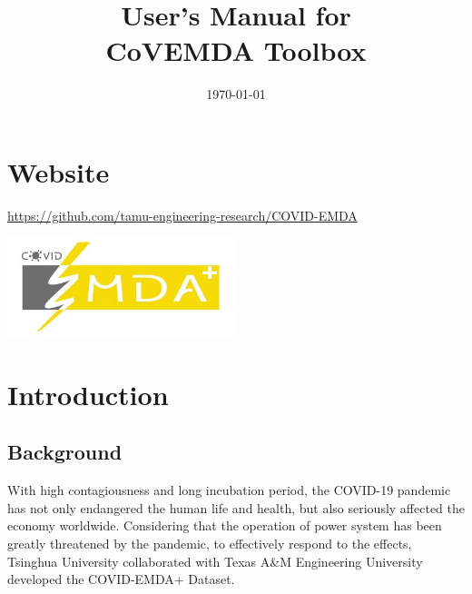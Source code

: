 \documentclass[11pt]{article}
\title{User's Manual for\\\textbf{CoVEMDA Toolbox}}
\author{}
\date{\today}
\numberwithin{equation}{section}
\numberwithin{table}{section}
\numberwithin{figure}{section}
\begin{document}
\makeatletter
\makeatother
\thispagestyle{empty}
\newpage
\tableofcontents
\thispagestyle{empty}


\newpage
\setcounter{page}{1}
\section*{Website}

\url{https://github.com/tamu-engineering-research/COVID-EMDA}

\begin{center}
	\noindent\includegraphics[width=0.5\textwidth]{figures/covid_emda_logo.JPG}
\end{center}



\newpage
\section{Introduction} \label{sec:intro}

\subsection{Background}

With high contagiousness and long incubation period, the COVID-19 pandemic has not only endangered the human life and health, but also seriously affected the economy worldwide. Considering that the operation of power system has been greatly threatened by the pandemic, to effectively respond to the effects, Tsinghua University collaborated with Texas A\&M Engineering University developed the COVID-EMDA+ Dataset.
\end{document}
